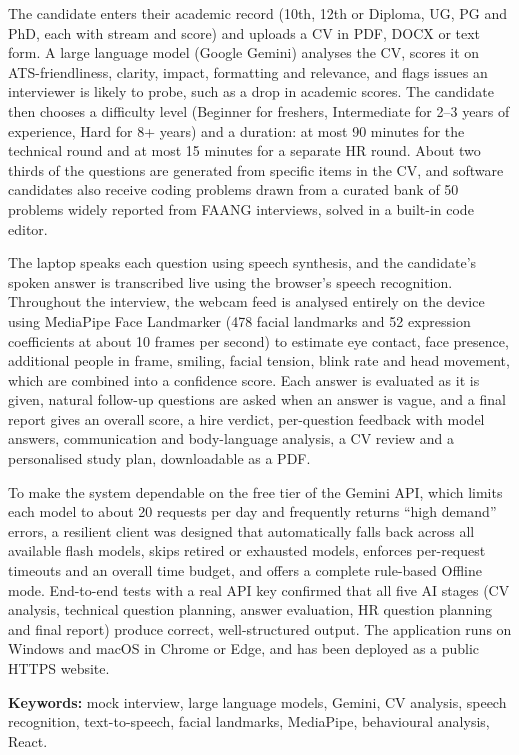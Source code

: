 \documentclass[12pt,a4paper,oneside]{report}
\begin{document}
The candidate enters their academic record (10th, 12th or Diploma, UG, PG and PhD, each with stream and score) and uploads a CV in PDF, DOCX or text form. A large language model (Google Gemini) analyses the CV, scores it on ATS-friendliness, clarity, impact, formatting and relevance, and flags issues an interviewer is likely to probe, such as a drop in academic scores. The candidate then chooses a difficulty level (Beginner for freshers, Intermediate for 2--3 years of experience, Hard for 8+ years) and a duration: at most 90 minutes for the technical round and at most 15 minutes for a separate HR round. About two thirds of the questions are generated from specific items in the CV, and software candidates also receive coding problems drawn from a curated bank of 50 problems widely reported from FAANG interviews, solved in a built-in code editor.

The laptop speaks each question using speech synthesis, and the candidate's spoken answer is transcribed live using the browser's speech recognition. Throughout the interview, the webcam feed is analysed entirely on the device using MediaPipe Face Landmarker (478 facial landmarks and 52 expression coefficients at about 10 frames per second) to estimate eye contact, face presence, additional people in frame, smiling, facial tension, blink rate and head movement, which are combined into a confidence score. Each answer is evaluated as it is given, natural follow-up questions are asked when an answer is vague, and a final report gives an overall score, a hire verdict, per-question feedback with model answers, communication and body-language analysis, a CV review and a personalised study plan, downloadable as a PDF.

To make the system dependable on the free tier of the Gemini API, which limits each model to about 20 requests per day and frequently returns ``high demand'' errors, a resilient client was designed that automatically falls back across all available flash models, skips retired or exhausted models, enforces per-request timeouts and an overall time budget, and offers a complete rule-based Offline mode. End-to-end tests with a real API key confirmed that all five AI stages (CV analysis, technical question planning, answer evaluation, HR question planning and final report) produce correct, well-structured output. The application runs on Windows and macOS in Chrome or Edge, and has been deployed as a public HTTPS website.

\vspace{0.5cm}
\noindent\textbf{Keywords:} mock interview, large language models, Gemini, CV analysis, speech recognition, text-to-speech, facial landmarks, MediaPipe, behavioural analysis, React.
\end{document}
